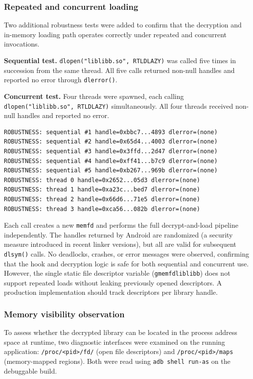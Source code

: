 \documentclass[11pt,a4paper]{report}
\renewcommand\_{{\textunderscore\allowbreak}}
\begin{document}
\subsubsection{Repeated and concurrent loading}

Two additional robustness tests were added to confirm that the decryption and in-memory loading path operates correctly under repeated and concurrent invocations.

\textbf{Sequential test.} \texttt{dlopen("liblibb.so", RTLD\_LAZY)} was called five times in succession from the same thread. All five calls returned non-null handles and reported no error through \texttt{dlerror()}.

\textbf{Concurrent test.} Four threads were spawned, each calling \texttt{dlopen("liblibb.so", RTLD\_LAZY)} simultaneously. All four threads received non-null handles and reported no error.

\begin{verbatim}
ROBUSTNESS: sequential #1 handle=0xbbc7...4893 dlerror=(none)
ROBUSTNESS: sequential #2 handle=0x65d4...4003 dlerror=(none)
ROBUSTNESS: sequential #3 handle=0x3ffd...2d47 dlerror=(none)
ROBUSTNESS: sequential #4 handle=0xff41...b7c9 dlerror=(none)
ROBUSTNESS: sequential #5 handle=0xb267...969b dlerror=(none)
ROBUSTNESS: thread 0 handle=0x2652...05d3 dlerror=(none)
ROBUSTNESS: thread 1 handle=0xa23c...bed7 dlerror=(none)
ROBUSTNESS: thread 2 handle=0x66d6...71e5 dlerror=(none)
ROBUSTNESS: thread 3 handle=0xca56...082b dlerror=(none)
\end{verbatim}

Each call creates a new \texttt{memfd} and performs the full decrypt-and-load pipeline independently. The handles returned by Android are randomized (a security measure introduced in recent linker versions), but all are valid for subsequent \texttt{dlsym()} calls. No deadlocks, crashes, or error messages were observed, confirming that the hook and decryption logic is safe for both sequential and concurrent use. However, the single static file descriptor variable (\texttt{g\_memfd\_liblibb}) does not support repeated loads without leaking previously opened descriptors. A production implementation should track descriptors per library handle.

\subsubsection{Memory visibility observation}

To assess whether the decrypted library can be located in the process address space at runtime, two diagnostic interfaces were examined on the running application: \texttt{/proc/<pid>/fd/} (open file descriptors) and \texttt{/proc/<pid>/maps} (memory-mapped regions). Both were read using \texttt{adb shell run-as} on the debuggable build.
\end{document}
